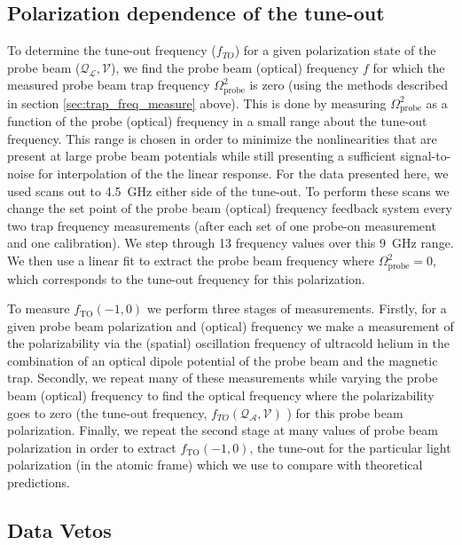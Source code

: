 \subsection{Polarization dependence of the tune-out}

	To determine the tune-out frequency (\(f_{TO}\)) for a given polarization state of the probe beam (\( \mathcal{Q_{L}},\mathcal{V} \)), we find the probe beam (optical) frequency $f$ for which the measured probe beam trap frequency \(\Omega_{\text{probe}}^2\) is zero (using the methods described in section \ref{sec:trap_freq_measure} above). 
	This is done by measuring \(\Omega_{\text{probe}}^2\) as a function of the probe (optical) frequency in a small range about the tune-out frequency. 
	This range is chosen in order to minimize the nonlinearities that are present at large probe beam potentials while still presenting a sufficient signal-to-noise for interpolation of the the linear response. For the data presented here, we used scans out to 4.5~GHz either side of the tune-out.
	To perform these scans we change the set point of the probe beam (optical) frequency feedback system every two trap frequency measurements (after each set of one probe-on measurement and one calibration). We step through 13 frequency values over this 9~GHz range. We then use a linear fit to extract the probe beam frequency where \(\Omega_{\text{probe}}^2=0\), which corresponds to the tune-out frequency for this polarization.



	To measure \(f_{\mathrm{TO}}(-1,0)\) we perform three stages of measurements. Firstly, for a given probe beam polarization and (optical) frequency we make a measurement of the polarizability via the (spatial) oscillation frequency of ultracold helium in the combination of an optical dipole potential of the probe beam and the magnetic trap. 
	Secondly, we repeat many of these measurements while varying the probe beam (optical) frequency to find the optical frequency where the polarizability goes to zero (the tune-out frequency, \(f_{TO}(\mathcal{Q_A},\mathcal{V})\) ) for this probe beam polarization. 
	Finally, we repeat the second stage at many values of probe beam polarization in order to extract  \(f_{\mathrm{TO}}(-1,0)\), the tune-out for the particular light polarization (in the atomic frame) which we use to compare with theoretical predictions.

\subsection{Data Vetos}

